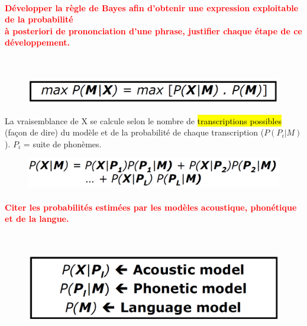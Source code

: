 \documentclass[letterpaper, 12pt]{article}
\newcommand{\red}[1]{
	\textcolor{red}{#1}
}
\begin{document}
		\paragraph{\red{Développer la règle de Bayes afin d'obtenir une expression exploitable de la probabilité 
		~\\ \hspace*{0.035cm} à posteriori de prononciation d'une phrase, justifier chaque étape de ce
		développement.}}~\\
			\begin{figure}[H]
				\centering
				\includegraphics[scale=0.3]{Images/bayes1_5}
			\end{figure}\noindent
			\begin{minipage}{0.4\textwidth}
				La vraisemblance de X se calcule selon le nombre de \hl{transcriptions possibles} (façon de dire) du
					modèle et de la probabilité de chaque transcription ($P(P_i|M)$). $P_i$ = suite de phonèmes.
			\end{minipage}\hfill
			\begin{minipage}{0.55\textwidth}
				\begin{figure}[H]
					\centering
					\includegraphics[scale=0.25]{Images/bayes2}
				\end{figure}\noindent
			\end{minipage}
		\paragraph{\red{Citer les probabilités estimées par les modèles acoustique, phonétique et de la langue.}}
		~\\
			\vspace*{-0.4cm}
			\begin{figure}[H]
				\centering
				\includegraphics[scale=0.2]{Images/bayes3}
			\end{figure}\noindent
\end{document}
